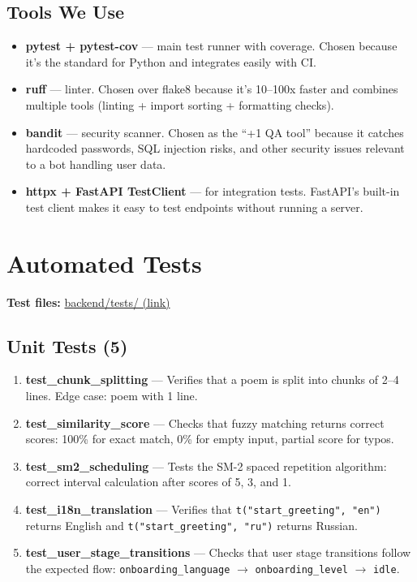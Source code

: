 \documentclass[11pt, a4paper]{article}
\begin{document}
\subsection*{Tools We Use}

\begin{itemize}
    \item \textbf{pytest + pytest-cov} --- main test runner with coverage. Chosen because it's the standard for Python and integrates easily with CI.
    \item \textbf{ruff} --- linter. Chosen over flake8 because it's 10--100x faster and combines multiple tools (linting + import sorting + formatting checks).
    \item \textbf{bandit} --- security scanner. Chosen as the ``+1 QA tool'' because it catches hardcoded passwords, SQL injection risks, and other security issues relevant to a bot handling user data.
    \item \textbf{httpx + FastAPI TestClient} --- for integration tests. FastAPI's built-in test client makes it easy to test endpoints without running a server.
\end{itemize}


\section{Automated Tests}

\textbf{Test files:} \href{https://github.com/d13-l1t3/PoetryForYou/tree/main/backend/tests}{backend/tests/ (link)}

\subsection*{Unit Tests (5)}

\begin{enumerate}
    \item \textbf{test\_chunk\_splitting} --- Verifies that a poem is split into chunks of 2--4 lines. Edge case: poem with 1 line.
    \item \textbf{test\_similarity\_score} --- Checks that fuzzy matching returns correct scores: 100\% for exact match, 0\% for empty input, partial score for typos.
    \item \textbf{test\_sm2\_scheduling} --- Tests the SM-2 spaced repetition algorithm: correct interval calculation after scores of 5, 3, and 1.
    \item \textbf{test\_i18n\_translation} --- Verifies that \texttt{t("start\_greeting", "en")} returns English and \texttt{t("start\_greeting", "ru")} returns Russian.
    \item \textbf{test\_user\_stage\_transitions} --- Checks that user stage transitions follow the expected flow: \texttt{onboarding\_language} $\rightarrow$ \texttt{onboarding\_level} $\rightarrow$ \texttt{idle}.
\end{enumerate}
\end{document}
